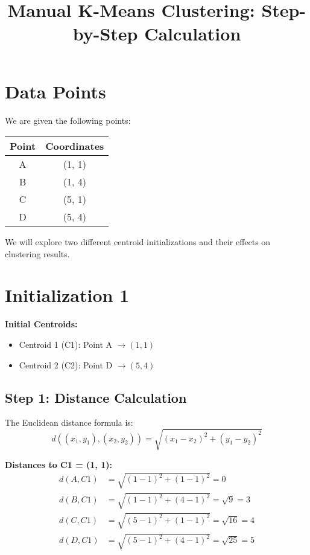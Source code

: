 \documentclass{article}
\title{Manual K-Means Clustering: Step-by-Step Calculation}
\author{}
\date{}
\begin{document}
\maketitle

\section*{Data Points}

We are given the following points:

\begin{center}
\begin{tabular}{cc}
\toprule
Point & Coordinates \\
\midrule
A & (1, 1) \\
B & (1, 4) \\
C & (5, 1) \\
D & (5, 4) \\
\bottomrule
\end{tabular}
\end{center}

We will explore two different centroid initializations and their effects on clustering results.

\section*{Initialization 1}

\textbf{Initial Centroids:}
\begin{itemize}
    \item Centroid 1 (C1): Point A $\rightarrow (1, 1)$
    \item Centroid 2 (C2): Point D $\rightarrow (5, 4)$
\end{itemize}

\subsection*{Step 1: Distance Calculation}

The Euclidean distance formula is:
\[
d((x_1, y_1), (x_2, y_2)) = \sqrt{(x_1 - x_2)^2 + (y_1 - y_2)^2}
\]

\textbf{Distances to C1 = (1, 1):}
\begin{align*}
d(A, C1) &= \sqrt{(1 - 1)^2 + (1 - 1)^2} = 0 \\
d(B, C1) &= \sqrt{(1 - 1)^2 + (4 - 1)^2} = \sqrt{9} = 3 \\
d(C, C1) &= \sqrt{(5 - 1)^2 + (1 - 1)^2} = \sqrt{16} = 4 \\
d(D, C1) &= \sqrt{(5 - 1)^2 + (4 - 1)^2} = \sqrt{25} = 5
\end{align*}
\end{document}
